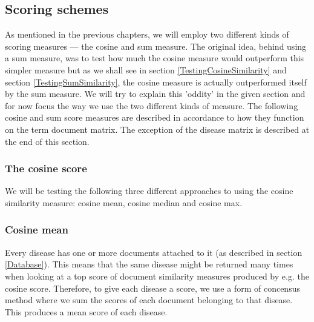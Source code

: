 \subsection{Scoring schemes}

As mentioned in the previous chapters, we will employ two different
kinds of scoring measures --- the cosine and sum measure. The original
idea, behind using a sum measure, was to test how much the cosine
measure would outperform this simpler measure but as we shall see in
section \ref{TestingCosineSimilarity} and section
\ref{TestingSumSimilarity}, the cosine measure is actually
outperformed itself by the sum measure. We will try to explain this
'oddity' in the given section and for now focus the way we use the two
different kinds of measure. The following cosine and sum score
measures are described in accordance to how they function on the term
document matrix. The exception of the disease matrix is described at
the end of this section.

\subsubsection{The cosine score\label{CosineScore}}

We will be testing the following three different approaches to using
the cosine similarity measure: cosine mean, cosine median and cosine
max.

\subsubsection{Cosine mean}
Every disease has one or more documents attached to it (as described
in section \ref{Database}). This means that the same disease might be
returned many times when looking at a top score of document similarity
measures produced by e.g. the cosine score. Therefore, to give each
disease a score, we use a form of concensus method where we sum the
scores of each document belonging to that disease. This produces a
mean score of each disease. \\

